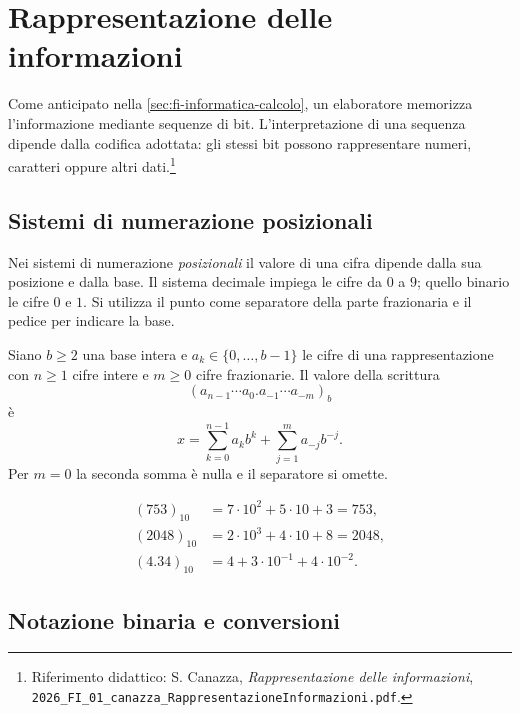 \chapter{Rappresentazione delle informazioni}
\label{chap:rappresentazione-informazioni}

Come anticipato nella \cref{sec:fi-informatica-calcolo}, un elaboratore
memorizza l'informazione mediante sequenze di bit. L'interpretazione
di una sequenza dipende dalla codifica adottata: gli stessi bit possono
rappresentare numeri, caratteri oppure altri dati.\footnote{Riferimento didattico:
S. Canazza, \emph{Rappresentazione delle informazioni},
\nolinkurl{2026_FI_01_canazza_RappresentazioneInformazioni.pdf}.}

\section{Sistemi di numerazione posizionali}
\label{sec:fi-notazione-posizionale}

Nei sistemi di numerazione \emph{posizionali} il valore di una cifra dipende
dalla sua posizione e dalla base. Il sistema decimale impiega le cifre da
\(0\) a \(9\); quello binario le cifre \(0\) e \(1\). Si utilizza il punto come
separatore della parte frazionaria e il pedice per indicare la base.

\begin{definition}
\label{def:fi-valore-posizionale}
Siano \(b\ge2\) una base intera e \(a_k\in\{0,\ldots,b-1\}\) le cifre di
una rappresentazione con \(n\ge1\) cifre intere e \(m\ge0\) cifre
frazionarie. Il valore della scrittura
\[
  (a_{n-1}\cdots a_0.a_{-1}\cdots a_{-m})_b
\]
è
\[
  x=\sum_{k=0}^{n-1}a_kb^k+\sum_{j=1}^{m}a_{-j}b^{-j}.
\]
Per \(m=0\) la seconda somma è nulla e il separatore si omette.
\end{definition}

\begin{example}
\begin{align*}
  (753)_{10}&=7\cdot10^2+5\cdot10+3=753,\\
  (2048)_{10}&=2\cdot10^3+4\cdot10+8=2048,\\
  (4.34)_{10}&=4+3\cdot10^{-1}+4\cdot10^{-2}.
\end{align*}
\end{example}

\section{Notazione binaria e conversioni}
\label{sec:fi-conversioni-binarie}

